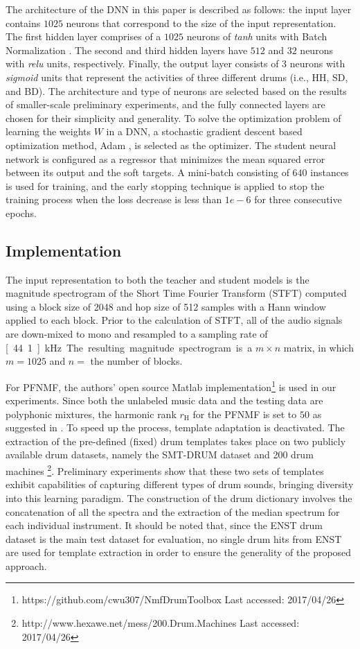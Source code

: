 \documentclass{article}
\begin{document}
The architecture of the DNN in this paper is described as follows: the input layer contains $1025$ neurons that correspond to the size of the input representation. The first hidden layer comprises of a $1025$ neurons of \textit{tanh} units with Batch Normalization \cite{Ioffe2015}. The second and third hidden layers have $512$ and $32$ neurons with \textit{relu} units, respectively. Finally, the output layer consists of 3 neurons with \textit{sigmoid} units that represent the activities of three different drums (i.e., HH, SD, and BD). The architecture and type of neurons are selected based on the results of smaller-scale preliminary experiments, and the fully connected layers are chosen for their simplicity and generality. To solve the optimization problem of learning the weights $W$ in a DNN, a stochastic gradient descent based optimization method, Adam \cite{Kingma2015}, is selected as the optimizer. The student neural network is configured as a regressor that minimizes the mean squared error between its output and the soft targets. A mini-batch consisting of $640$ instances is used for training, and the early stopping technique is applied to stop the training process when the loss decrease is less than $1e-6$ for three consecutive epochs. 

\subsection{Implementation}
The input representation to both the teacher and student models is the magnitude spectrogram of the Short Time Fourier Transform (STFT) computed using a block size of 2048 and hop size of 512 samples with a Hann window applied to each block. Prior to the calculation of STFT, all of the audio signals are down-mixed to mono and resampled to a sampling rate of \unit[44.1]{kHz}. The resulting magnitude spectrogram is a $m \times n$ matrix, in which $m = 1025$ and $n = $ the number of blocks. 

For PFNMF, the authors' open source Matlab implementation\footnote{https://github.com/cwu307/NmfDrumToolbox Last accessed: 2017/04/26} is used in our experiments. Since both the unlabeled music data and the testing data are polyphonic mixtures, the harmonic rank $r_\mathrm{H} $ for the PFNMF is set to $50$ as suggested in \cite{Wu2015a}. To speed up the process, template adaptation is deactivated. The extraction of the pre-defined (fixed) drum templates takes place on two publicly available drum datasets, namely the SMT-DRUM dataset \cite{Dittmar2014} and 200 drum machines \footnote{http://www.hexawe.net/mess/200.Drum.Machines Last accessed: 2017/04/26}. Preliminary experiments show that these two sets of templates exhibit capabilities of capturing different types of drum sounds, bringing diversity into this learning paradigm. The construction of the drum dictionary involves the concatenation of all the spectra and the extraction of the median spectrum for each individual instrument. It should be noted that, since the ENST drum dataset is the main test dataset for evaluation, no single drum hits from ENST are used for template extraction in order to ensure the generality of the proposed approach.
\end{document}
